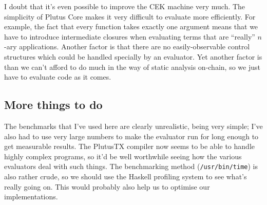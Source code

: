 \documentclass[a4paper]{article}
\begin{document}
I doubt that it's even possible to improve the CEK machine very much.
The simplicity of Plutus Core makes it very difficult to evaluate more
efficiently.  For example, the fact that every function takes exactly
one argument means that we have to introduce intermediate closures
when evaluating terms that are ``really'' $n$-ary applications.  Another
factor is that there are no easily-observable control structures which
could be handled specially by an evaluator.  Yet another factor is
than we can't afford to do much in the way of static analysis on-chain,
so we just have to evaluate code as it comes.

\subsection{More things to do}
The benchmarks that I've used here are clearly unrealistic, being very
simple; I've also had to use very large numbers to make the evaluator
run for long enough to get measurable results. The PlutusTX compiler
now seems to be able to handle highly complex programs, so it'd be
well worthwhile seeing how the various evaluators deal with such
things.  The benchmarking method (\texttt{/usr/bin/time}) is also
rather crude, so we should use the Haskell profiling system to see
what's really going on.  This would probably also help us to optimise
our implementations.




\end{document}
